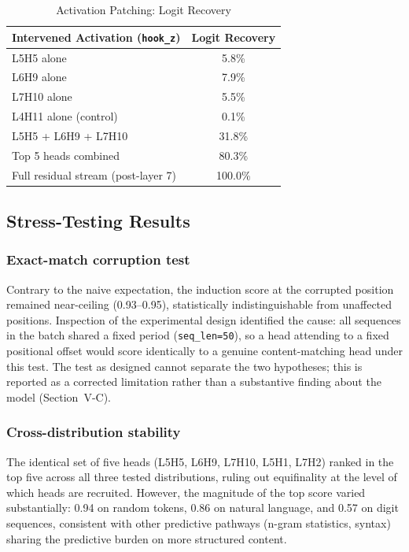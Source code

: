 \documentclass[conference]{IEEEtran}
\begin{document}
\begin{table}[htbp]
\centering
\caption{Activation Patching: Logit Recovery}
\label{tab:patching}
\begin{tabular}{lc}
\toprule
\textbf{Intervened Activation (\texttt{hook\_z})} & \textbf{Logit Recovery} \\
\midrule
L5H5 alone & 5.8\% \\
L6H9 alone & 7.9\% \\
L7H10 alone & 5.5\% \\
L4H11 alone (control) & 0.1\% \\
L5H5 + L6H9 + L7H10 & 31.8\% \\
Top 5 heads combined & 80.3\% \\
Full residual stream (post-layer 7) & 100.0\% \\
\bottomrule
\end{tabular}
\end{table}

\subsection{Stress-Testing Results}

\subsubsection{Exact-match corruption test}
Contrary to the naive expectation, the induction score at the corrupted position remained near-ceiling (0.93--0.95), statistically indistinguishable from unaffected positions. Inspection of the experimental design identified the cause: all sequences in the batch shared a fixed period (\texttt{seq\_len=50}), so a head attending to a fixed positional offset would score identically to a genuine content-matching head under this test. The test as designed cannot separate the two hypotheses; this is reported as a corrected limitation rather than a substantive finding about the model (Section~V-C).

\subsubsection{Cross-distribution stability}
The identical set of five heads (L5H5, L6H9, L7H10, L5H1, L7H2) ranked in the top five across all three tested distributions, ruling out equifinality at the level of which heads are recruited. However, the magnitude of the top score varied substantially: 0.94 on random tokens, 0.86 on natural language, and 0.57 on digit sequences, consistent with other predictive pathways (n-gram statistics, syntax) sharing the predictive burden on more structured content.
\end{document}
